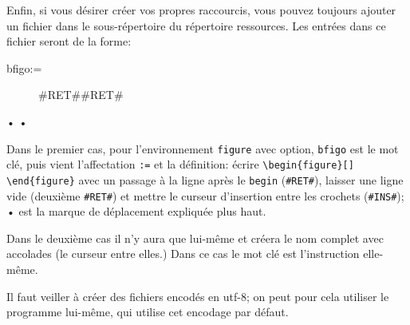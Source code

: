 Enfin, si vous désirer créer vos propres raccourcis, vous pouvez toujours ajouter un fichier  dans le sous-répertoire  du répertoire ressources. 
Les entrées dans ce fichier seront de la forme:
\begin{verbExample}
bfigo:=\begin{figure}[#INS#]#RET##RET#\end{figure}•
•
\end{verbExample}

Dans le premier cas, pour l'environnement \verb|figure| avec option, \verb|bfigo| est le mot clé, puis vient l'affectation \verb|:=| et la définition: écrire \verb|\begin{figure}[]| \verb|\end{figure}| avec un passage à la ligne après le \verb|begin| (\verb|#RET#|), laisser une ligne vide (deuxième \verb|#RET#|) et mettre le curseur d'insertion entre les crochets (\verb|#INS#|); \og•\fg{} est la marque de déplacement expliquée plus haut.

Dans le deuxième cas il n'y aura que \verb|| lui-même et \Tw{} créera le nom complet avec accolades (le curseur entre elles.) Dans ce cas le mot clé est l'instruction elle-même.


Il faut veiller à créer des fichiers  encodés en utf-8; on peut pour cela utiliser le programme \Tw{} lui-même, qui utilise cet encodage par défaut.

